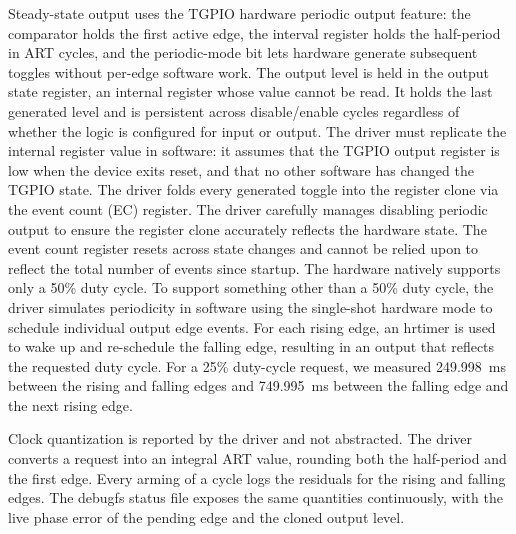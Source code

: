 \documentclass[conference,a4paper]{IEEEtran}
\begin{document}
Steady-state output uses the TGPIO hardware periodic output feature: the comparator holds the first active edge, the interval register holds the half-period in ART cycles, and the periodic-mode bit lets hardware generate subsequent toggles without per-edge software work. The output level is held in the output state register, an internal register whose value cannot be read.  It holds the last generated level and is persistent across disable/enable cycles regardless of whether the logic is configured for input or output. The driver must replicate the internal register value in software: it assumes that the TGPIO output register is low when the device exits reset, and that no other software has changed the TGPIO state. The driver folds every generated toggle into the register clone via the event count (EC) register.  The driver carefully manages disabling periodic output to ensure the register clone accurately reflects the hardware state. The event count register resets across state changes and cannot be relied upon to reflect the total number of events since startup. The hardware natively supports only a 50\% duty cycle. To support something other than a 50\% duty cycle, the driver simulates periodicity in software using the single-shot hardware mode to schedule individual output edge events. For each rising edge, an hrtimer is used to wake up and re-schedule the falling edge, resulting in an output that reflects the requested duty cycle. For a 25\% duty-cycle request, we measured 249.998~ms between the rising and falling edges and 749.995~ms between the falling edge and the next rising edge.


Clock quantization is reported by the driver and not abstracted. The driver converts a request into an integral ART value, rounding both the half-period and the first edge. Every arming of a cycle logs the residuals for the rising and falling edges. The debugfs status file exposes the same quantities continuously, with the live phase error of the pending edge and the cloned output level.
\end{document}
